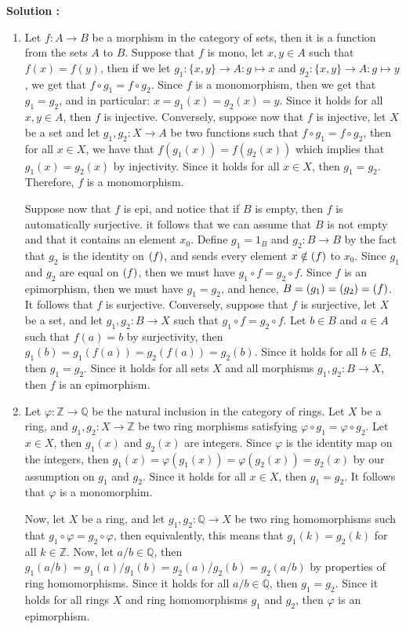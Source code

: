 \documentclass{article}
\newcommand{\Q}{\mathbb{Q}}
\newcommand{\Z}{\mathbb{Z}}
\let\Im\relax
\DeclareMathOperator{\Im}{Im}
\begin{document}
\noindent \textbf{Solution :}
\begin{enumerate}[label=(\alph*)]
    \item Let $f : A \to B$ be a morphism in the category of sets, then it is a function from the sets $A$ to $B$. Suppose that $f$ is mono, let $x, y \in A$ such that $f(x) = f(y)$, then if we let $g_1 : \{x,y\} \to A : g \mapsto x$ and $g_2 : \{x,y\} \to A : g \mapsto y$, we get that $f \circ g_1 = f \circ g_2$. Since $f$ is a monomorphism, then we get that $g_1 = g_2$, and in particular: $x = g_1(x) = g_2(x) = y$. Since it holds for all $x,y \in A$, then $f$ is injective. Conversely, suppose now that $f$ is injective, let $X$ be a set and let $g_1, g_2 : X \to A$ be two functions such that $f \circ g_1 = f \circ g_2$, then for all $x \in X$, we have that $f(g_1(x)) = f(g_2(x))$ which implies that $g_1(x) = g_2(x)$ by injectivity. Since it holds for all $x \in X$, then $g_1 = g_2$. Therefore, $f$ is a monomorphism.
    
    Suppose now that $f$ is epi, and notice that if $B$ is empty, then $f$ is automatically surjective. it follows that we can assume that $B$ is not empty and that it contains an element $x_0$. Define $g_1 = 1_B$ and $g_2 : B \to B$ by the fact that $g_2$ is the identity on $\Im(f)$, and sends every element $x \notin \Im(f)$ to $x_0$. Since $g_1$ and $g_2$ are equal on $\Im(f)$, then we must have $g_1 \circ f = g_2 \circ f$. Since $f$ is an epimorphism, then we must have $g_1 = g_2$, and hence, $B = \Im(g_1) = \Im(g_2) = \Im(f)$. It follows that $f$ is surjective. Conversely, suppose that $f$ is surjective, let $X$ be a set, and let $g_1, g_2 : B \to X$ such that $g_1 \circ f = g_2 \circ f$. Let $b \in B$ and $a \in A$ such that $f(a) = b$ by surjectivity, then $g_1(b) = g_1(f(a)) = g_2(f(a)) = g_2(b)$. Since it holds for all $b \in B$, then $g_1 = g_2$. Since it holds for all sets $X$ and all morphisms $g_1, g_2 : B \to X$, then $f$ is an epimorphism. 
    \item Let $\varphi : \Z \to \Q$ be the natural inclusion in the category of rings. Let $X$ be a ring, and $g_1, g_2 : X \to \Z$ be two ring morphisms satisfying $\varphi \circ g_1 = \varphi \circ g_2$. Let $x \in X$, then $g_1(x)$ and $g_2(x)$ are integers. Since $\varphi$ is the identity map on the integers, then $g_1(x) = \varphi(g_1(x)) = \varphi(g_2(x)) = g_2(x)$ by our assumption on $g_1$ and $g_2$. Since it holds for all $x \in X$, then $g_1 = g_2$. It follows that $\varphi$ is a monomorphim.
    
    Now, let $X$ be a ring, and let $g_1, g_2 : \Q \to X$ be two ring homomorphisms such that $g_1 \circ \varphi = g_2 \circ \varphi$, then equivalently, this means that $g_1(k) = g_2(k)$ for all $k \in \Z$. Now, let $a/b \in \Q$, then $g_1(a/b) = g_1(a)/g_1(b) = g_2(a)/g_2(b) = g_2(a/b)$ by properties of ring homomorphisms. Since it holds for all $a/b \in \Q$, then $g_1 = g_2$. Since it holds for all rings $X$ and ring homomorphisms $g_1$ and $g_2$, then $\varphi$ is an epimorphism.


\end{enumerate}
\end{document}
